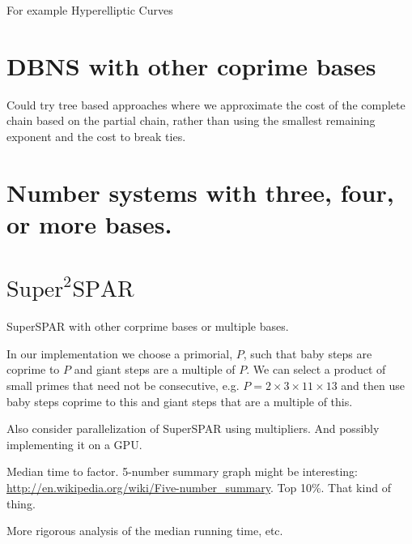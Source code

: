 \documentclass{ucalgthes1}
\theoremstyle{definition}
\begin{document}
For example Hyperelliptic Curves

\section{DBNS with other coprime bases}

Could try tree based approaches where we approximate the cost of the complete chain based on the partial chain, rather than using the smallest remaining exponent and the cost to break ties.

\section{Number systems with three, four, or more bases.}

\section{$\textrm{Super}^2\textrm{SPAR}$}

SuperSPAR with other corprime bases or multiple bases.

In our implementation we choose a primorial, $P$, such that baby steps are coprime to $P$ and giant steps are a multiple of $P$.  We can select a product of small primes that need not be consecutive, e.g. $P = 2 \times 3 \times 11 \times 13$ and then use baby steps coprime to this and giant steps that are a multiple of this.

Also consider parallelization of SuperSPAR using multipliers.  And possibly implementing it on a GPU.

Median time to factor. 5-number summary graph might be interesting: \url{http://en.wikipedia.org/wiki/Five-number_summary}. Top 10\%.  That kind of thing.

More rigorous analysis of the median running time, etc.



\end{document}
